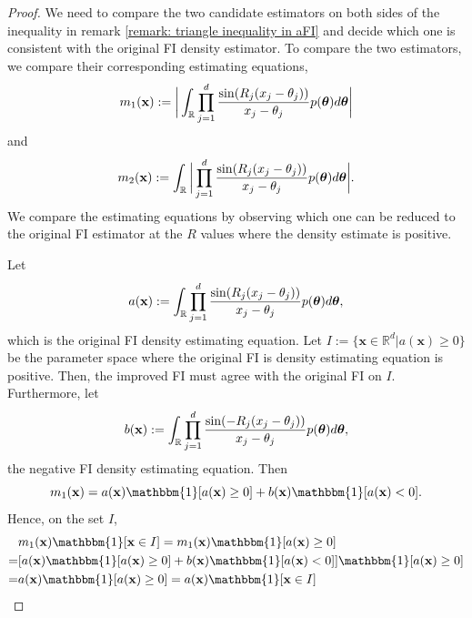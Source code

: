 \documentclass[%
 reprint,
 amsmath,amssymb,
 aps,
]{revtex4-2}
\def\R{\mathbb{R}}
\def\xbold{\mathbf{x}}
\newcommand{\btheta}{\mbox{\boldmath $\theta$}}
\begin{document}
\begin{proof}
    We need to compare the two candidate estimators on both sides of the inequality in remark \ref{remark: triangle inequality in aFI} and decide which one is consistent with the original FI density estimator. To compare the two estimators, we compare their corresponding estimating equations,
    \begin{equation*}
         m_1(\xbold) := \bigg|\int_\R \prod_{j = 1}^d \frac{\sin(R_j(x_j - \theta_j))}{x_j - \theta_j} p(\btheta)d\btheta\bigg|
    \end{equation*}
    and
    \begin{equation*}
        m_2(\xbold) := \int_\R \bigg|\prod_{j = 1}^d \frac{\sin(R_j(x_j - \theta_j))}{x_j - \theta_j} p(\btheta)d\btheta\bigg|.
    \end{equation*}
    We compare the estimating equations by observing which one can be reduced to the original FI estimator at the $R$ values where the density estimate is positive.

    Let
    \begin{equation*}
        a(\xbold) := \int_\R \prod_{j = 1}^d \frac{\sin(R_j(x_j - \theta_j))}{x_j - \theta_j} p(\btheta)d\btheta,
    \end{equation*}
    which is the original FI density estimating equation. Let $I := \{\xbold \in \R^d | a(\xbold) \ge 0\}$ be the parameter space where the original FI is density estimating equation is positive. Then, the improved FI must agree with the original FI on $I$. Furthermore, let
    \begin{equation*}
        b(\xbold) := \int_\R \prod_{j = 1}^d \frac{\sin(-R_j(x_j - \theta_j))}{x_j - \theta_j} p(\btheta)d\btheta,
    \end{equation*}
    the negative FI density estimating equation. Then
    \begin{equation*}
        m_1(\xbold) = a(\xbold)\mathbbm{1}[a(\xbold) \ge 0] + b(\xbold) \mathbbm{1}[a(\xbold) < 0].
    \end{equation*}
    Hence, on the set $I$,
    \begin{align*}
        & m_1(\xbold)\mathbbm{1}[\xbold \in I] = m_1(\xbold)\mathbbm{1}[a(\xbold) \ge 0] \\
        = & [a(\xbold)\mathbbm{1}[a(\xbold) \ge 0] + b(\xbold) \mathbbm{1}[a(\xbold) < 0]]\mathbbm{1}[a(\xbold) \ge 0] \\
        = & a(\xbold)\mathbbm{1}[a(\xbold) \ge 0] = a(\xbold)\mathbbm{1}[\xbold \in I]
    \end{align*}


\end{proof}
\end{document}
